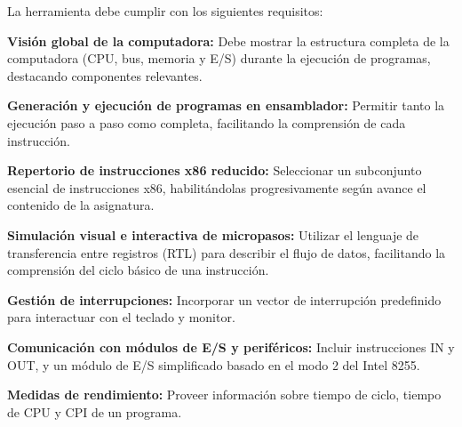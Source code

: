 \documentclass[12pt,twoside]{templates/unerthesis}
\begin{document}
La herramienta debe cumplir con los siguientes requisitos:

\textbf{Visión global de la computadora:} Debe mostrar la estructura completa de la computadora (CPU, bus, memoria y E/S) durante la ejecución de programas, destacando componentes relevantes.

\textbf{Generación y ejecución de programas en ensamblador:} Permitir tanto la ejecución paso a paso como completa, facilitando la comprensión de cada instrucción.

\textbf{Repertorio de instrucciones x86 reducido:} Seleccionar un subconjunto esencial de instrucciones x86, habilitándolas progresivamente según avance el contenido de la asignatura.

\textbf{Simulación visual e interactiva de micropasos:} Utilizar el lenguaje de transferencia entre registros (RTL) para describir el flujo de datos, facilitando la comprensión del ciclo básico de una instrucción.

\textbf{Gestión de interrupciones:} Incorporar un vector de interrupción predefinido para interactuar con el teclado y monitor.

\textbf{Comunicación con módulos de E/S y periféricos:} Incluir instrucciones IN y OUT, y un módulo de E/S simplificado basado en el modo 2 del Intel 8255.

\textbf{Medidas de rendimiento:} Proveer información sobre tiempo de ciclo, tiempo de CPU y CPI de un programa.
\end{document}
